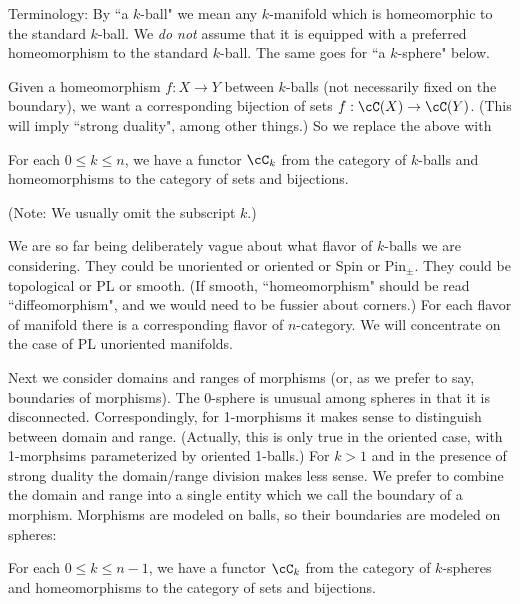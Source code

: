 Terminology: By ``a $k$-ball" we mean any $k$-manifold which is homeomorphic to the 
standard $k$-ball.
We {\it do not} assume that it is equipped with a 
preferred homeomorphism to the standard $k$-ball.
The same goes for ``a $k$-sphere" below.


Given a homeomorphism $f:X\to Y$ between $k$-balls (not necessarily fixed on 
the boundary), we want a corresponding
bijection of sets $f:\cC(X)\to \cC(Y)$.
(This will imply ``strong duality", among other things.)
So we replace the above with

\begin{axiom}[Morphisms]
\label{axiom:morphisms}
For each $0 \le k \le n$, we have a functor $\cC_k$ from 
the category of $k$-balls and 
homeomorphisms to the category of sets and bijections.
\end{axiom}


(Note: We usually omit the subscript $k$.)

We are so far  being deliberately vague about what flavor of $k$-balls
we are considering.
They could be unoriented or oriented or Spin or $\mbox{Pin}_\pm$.
They could be topological or PL or smooth.
(If smooth, ``homeomorphism" should be read ``diffeomorphism", and we would need
to be fussier about corners.)
For each flavor of manifold there is a corresponding flavor of $n$-category.
We will concentrate on the case of PL unoriented manifolds.

Next we consider domains and ranges of morphisms (or, as we prefer to say, boundaries
of morphisms).
The 0-sphere is unusual among spheres in that it is disconnected.
Correspondingly, for 1-morphisms it makes sense to distinguish between domain and range.
(Actually, this is only true in the oriented case, with 1-morphsims parameterized
by oriented 1-balls.)
For $k>1$ and in the presence of strong duality the domain/range division makes less sense.
We prefer to combine the domain and range into a single entity which we call the 
boundary of a morphism.
Morphisms are modeled on balls, so their boundaries are modeled on spheres:


\begin{axiom}
For each $0 \le k \le n-1$, we have a functor $\cC_k$ from 
the category of $k$-spheres and 
homeomorphisms to the category of sets and bijections.
\end{axiom}

